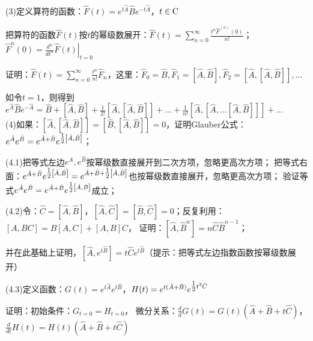 (3)定义算符的函数：$\hat F(t) = e^{t\hat A} \hat Be^{ - t\hat A} $，$t \in {\rm{C}}$

把算符的函数$\hat F(t)$按$t$的幂级数展开：$\hat F(t) = \sum\limits_{n = 0}^\infty  {\frac{{t^n \hat F^{(n)} \left( 0 \right)}}{{n!}}} $；$\hat F^n (0) = \left. {\frac{{d^n }}{{dt^n }}\hat F(t)} \right|_{t = 0} $

证明：$\hat F(t) = \sum\limits_{n = 0}^\infty  {\frac{{t^n }}{{n!}}\hat F_n } $，这里：$\hat F_0  = \hat B,\hat F_1  = \left[ {\hat A,\hat B} \right],\hat F_2  = \left[ {\hat A,\left[ {\hat A,\hat B} \right]} \right],...$

如令$t = 1$，则得到$e^{\hat A} \hat Be^{ - \hat A}  = \hat B + \left[ {\hat A,\hat B} \right] + \frac{1}{{2!}}\left[ {\hat A,\left[ {\hat A,\hat B} \right]} \right] + ... + \frac{1}{{n!}}\left[ {\hat A,\left[ {\hat A,...\left[ {\hat A,\hat B} \right]} \right]} \right] + ...$\\



(4)如果：$\left[ {\hat A,\left[ {\hat A,\hat B} \right]} \right] = \left[ {\hat B,\left[ {\hat A,\hat B} \right]} \right] = 0$，证明Glauber公式：$e^{\hat A} e^{\hat B}  = e^{\hat A + \hat B} e^{{\textstyle{1 \over 2}}\left[ {\hat A,\hat B} \right]} $；


(4.1)把等式左边$e^{\hat A} ,e^{\hat B} $按幂级数直接展开到二次方项，忽略更高次方项；
把等式右面：$e^{\hat A + \hat B} e^{{\textstyle{1 \over 2}}\left[ {\hat A,\hat B} \right]}  = e^{\hat A + \hat B + {\textstyle{1 \over 2}}\left[ {\hat A,\hat B} \right]} $也按幂级数直接展开，忽略更高次方项；
验证等式$e^{\hat A} e^{\hat B}  = e^{\hat A + \hat B} e^{{\textstyle{1 \over 2}}\left[ {\hat A,\hat B} \right]} $成立；


(4.2)令：$\hat C = \left[ {\hat A,\hat B} \right]$，$\left[ {\hat A,\hat C} \right] = \left[ {\hat B,\hat C} \right] = 0$；反复利用：$\left[ {A,BC} \right] = B\left[ {A,C} \right] + \left[ {A,B} \right]C$，
证明：$\left[ {\hat A,\hat B^n } \right] = n\hat C\hat B^{n - 1} $；

并在此基础上证明，$\left[ {\hat A,e^{t\hat B} } \right] = t\hat Ce^{t\hat B} $（提示：把等式左边指数函数按幂级数展开）

(4.3)定义函数：$G(t) = e^{t\hat A} e^{t\hat B} $，$H(t) = e^{t(\hat A + \hat B)} e^{{\textstyle{1 \over 2}}t^2 \hat C} $

证明：初始条件：$G_{t = 0}  = H_{t = 0} $，
微分关系：$\frac{d}{d}G(t) = G(t)\left( {\hat A + \hat B + t\hat C} \right)$，$\frac{d}{{dt}}H(t) = H(t)\left( {\hat A + \hat B + t\hat C} \right)$

